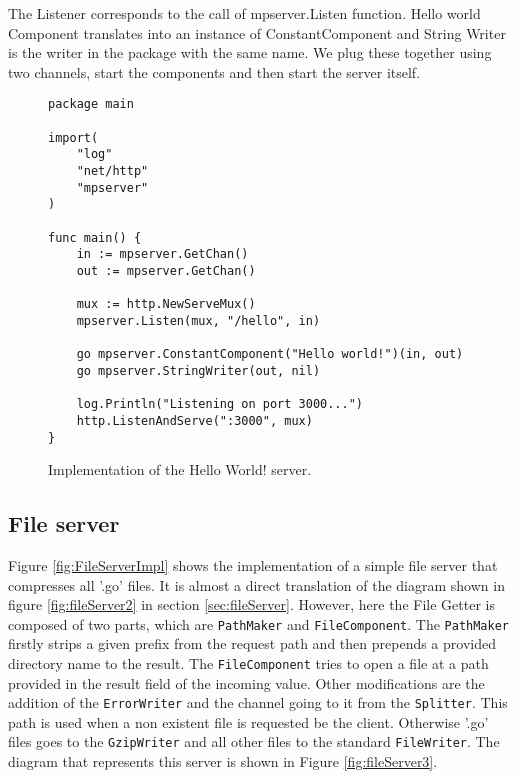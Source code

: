 \documentclass[12pt,a4paper]{article}
\begin{document}
The Listener corresponds to the call of mpserver.Listen function.
Hello world Component translates into an instance of ConstantComponent
and String Writer is the writer in the package with the same name.
We plug these together using two channels, start the components 
and then start the server itself.

\begin{figure}[h]
\centering
\begin{lstlisting}
package main

import(
    "log"
    "net/http"
    "mpserver"
)

func main() {
    in := mpserver.GetChan()
    out := mpserver.GetChan()

    mux := http.NewServeMux()
    mpserver.Listen(mux, "/hello", in)

    go mpserver.ConstantComponent("Hello world!")(in, out)
    go mpserver.StringWriter(out, nil)
    
    log.Println("Listening on port 3000...")
    http.ListenAndServe(":3000", mux)
}
\end{lstlisting}
\caption[scale=1.0]{Implementation of the Hello World! server.}
\label{fig:HelloWorldImpl}
\end{figure}

\newpage
\subsection{File server}
Figure \ref{fig:FileServerImpl} shows the implementation of a simple 
file server that compresses all '.go' files. It is almost a direct translation
of the diagram shown in figure \ref{fig:fileServer2} in section \ref{sec:fileServer}.
However, here the File Getter is composed of two parts, which are \texttt{PathMaker}
and \texttt{FileComponent}. The \texttt{PathMaker} firstly strips a given
prefix from the request path and then prepends a provided directory name to 
the result. The \texttt{FileComponent} tries to open a file at a path 
provided in the result field of the incoming value. Other modifications
are the addition of the \texttt{ErrorWriter} and the channel going to it from
the \texttt{Splitter}.
This path is used when a non existent file is requested be the client.
Otherwise '.go' files goes to the \texttt{GzipWriter} and all other files to 
the standard \texttt{FileWriter}.
The diagram that represents this server is shown in 
Figure \ref{fig:fileServer3}.
\end{document}

